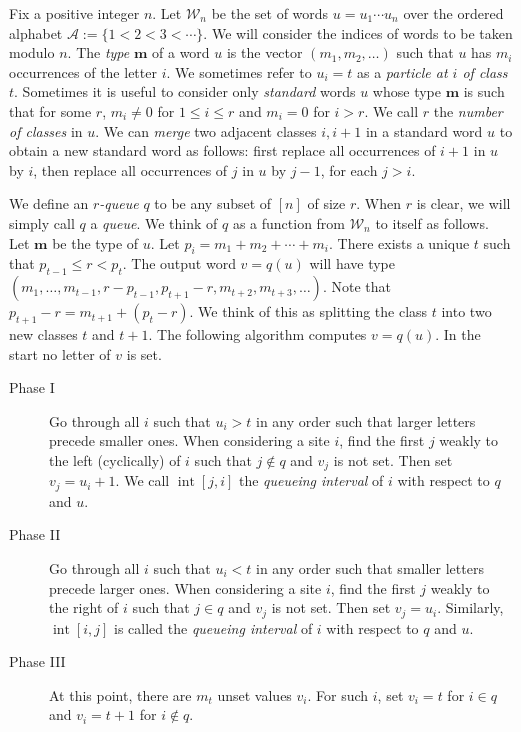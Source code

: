 \documentclass[reqno]{amsart}
\newcommand{\0}{\phantom{c}}
\DeclareMathOperator{\inter}{int} %
\newcommand{\mm}{\mathbf{m}}
\newcommand{\mcA}{\mathcal{A}}
\newcommand{\mcW}{\mathcal{W}}
\newcommand{\defn}[1]{{\color{darkred}\emph{#1}}} %
\theoremstyle{plain}
\theoremstyle{definition}
\numberwithin{equation}{section}
\begin{document}
Fix a positive integer $n$.
Let $\mcW_n$ be the set of words $u = u_1 \dotsm u_n$ over the ordered alphabet $\mcA := \{1 < 2 < 3 < \cdots \}$.
We will consider the indices of words to be taken modulo $n$. 
The \defn{type} $\mm$ of a word $u$ is the vector $(m_1, m_2, \ldots)$ such that $u$ has $m_i$ occurrences of the letter $i$.
We sometimes refer to $u_i = t$ as a \defn{particle at $i$ of class $t$}.
Sometimes it is useful to consider only \defn{standard} words $u$ whose type $\mm$ is such that for some $r$, $m_i \neq 0$ for $1 \leq i \leq r$ and $m_i = 0$ for $i > r$.
We call $r$ the \defn{number of classes} in $u$.
We can \defn{merge} two adjacent classes $i,i+1$ in a standard word $u$ to obtain a new standard word as follows: first replace all occurrences of $i+1$ in $u$ by $i$, then replace all occurrences of $j$ in $u$ by $j-1$, for each $j > i$.

We define an \defn{$r$-queue} $q$ to be any subset of $[n]$ of size $r$. When $r$ is clear, we will simply call $q$ a \defn{queue}.
We think of $q$ as a function from $\mcW_n$ to itself as follows.
Let $\mm$ be the type of $u$.
Let $p_i = m_1 + m_2 + \cdots + m_i$.
There exists a unique $t$ such that
$
p_{t-1} \leq r < p_t.
$
The output word $v = q(u)$ will have type $(m_1, \dots, m_{t-1}, r-p_{t-1}, p_{t+1}-r, m_{t+2}, m_{t+3}, \ldots)$.
Note that $p_{t+1} - r = m_{t+1} + (p_t - r)$.
We think of this as splitting the class $t$ into two new classes $t$ and $t+1$. The following algorithm computes $v = q(u)$. In the start no letter of $v$ is set.

\begin{description}
\item[Phase I]
  Go through all $i$ such that $u_i > t$ in any order such that larger letters precede smaller ones.
  When considering a site $i$, find the first $j$ weakly to the left (cyclically) of $i$ such that $j \notin q$ and $v_j$ is not set. Then set $v_j = u_i + 1$. We call $\inter[j,i]$ the \defn{queueing interval} of $i$ with respect to $q$ and $u$.

\item[Phase II]
  Go through all $i$ such that $u_i < t$ in any order such that smaller letters precede larger ones.
  When considering a site $i$, find the first $j$ weakly to the right of $i$ such that $j \in q$ and $v_j$ is not set. Then set $v_j = u_i$. Similarly, $\inter[i,j]$ is called the \defn{queueing interval} of $i$ with respect to $q$ and $u$.

\item[Phase III]
  At this point, there are $m_t$ unset values $v_i$. For such $i$, set $v_i = t$ for $i \in q$ and $v_i = t+1$ for $i\notin q$.
\end{description}
\end{document}
